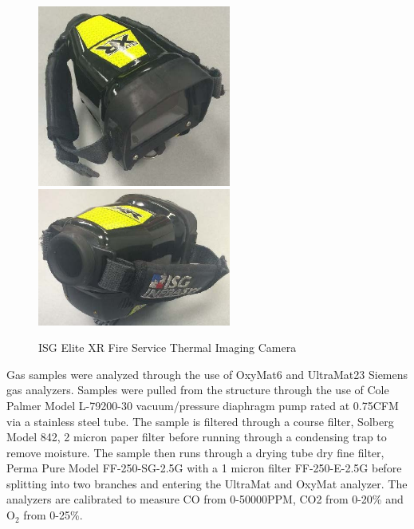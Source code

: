 \documentclass[12pt,oneside]{book}
\begin{document}
\begin{figure} [H]
	\centering
	\includegraphics[width = 2.5in]{0_Images/Instrumentation/ISG_IR.jpg}
	\includegraphics[width = 2.5in]{0_Images/Instrumentation/ISG_IR2.jpg}
	\caption{ISG Elite XR Fire Service Thermal Imaging Camera}
	\label{fig:IRCam}
\end{figure}

Gas samples were analyzed through the use of OxyMat6 and UltraMat23 Siemens gas analyzers. Samples were pulled from the structure through the use of Cole Palmer Model L-79200-30 vacuum/pressure diaphragm pump rated at 0.75CFM via a stainless steel tube. The sample is filtered through a course filter, Solberg Model 842, 2 micron paper filter before running through a condensing trap to remove moisture. The sample then runs through a drying tube dry fine filter, Perma Pure Model FF-250-SG-2.5G with a 1 micron filter FF-250-E-2.5G before splitting into two branches and entering the UltraMat and OxyMat analyzer. The analyzers are calibrated to measure CO from 0-50000PPM, CO2 from 0-20\% and O$_2$ from 0-25\%. 
\end{document}
